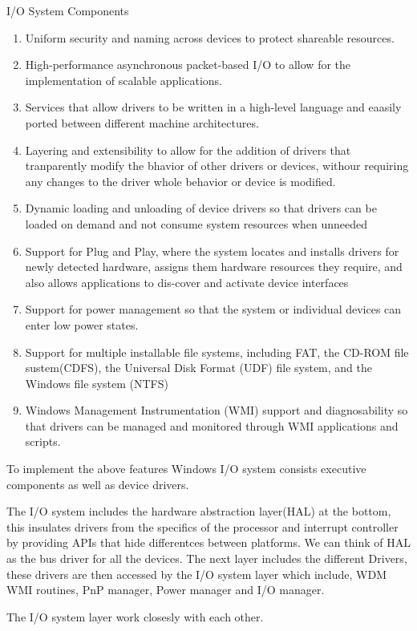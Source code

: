 \documentclass[letterpaper,10pt,draftclsnofoot,onecolumn]{IEEEtran}
\begin{document}
I/O System Components
\begin{enumerate}
\item Uniform security and naming across devices to protect shareable resources.
\item High-performance asynchronous packet-based I/O to allow for the implementation of scalable applications.
\item Services that allow drivers to be written in a high-level language and eaasily ported between different machine architectures.
\item Layering and extensibility to allow for the addition of drivers that tranparently modify the bhavior of other drivers or devices, withour requiring any changes to the driver whole behavior or device is modified.
\item Dynamic loading and unloading of device drivers so that drivers can be loaded on demand and not consume system resources when unneeded
\item Support for Plug and Play, where the system locates and installs drivers for newly detected hardware, assigns them hardware resources they require, and also allows applications to dis-cover and activate device interfaces
\item Support for power management so that the system or individual devices can enter low power states.
\item Support for multiple installable file systems, including FAT, the CD-ROM file sustem(CDFS), the Universal Disk Format (UDF) file system, and the Windows file system (NTFS)
\item Windows Management Instrumentation (WMI) support and diagnosability so that drivers can be managed and monitored through WMI applications and scripts.\cite{[1]}
\end{enumerate}

To implement the above features Windows I/O system consists executive components as well as device drivers.

The I/O system includes the hardware abstraction layer(HAL) at the bottom, this insulates drivers from the specifics of the processor and interrupt controller by providing APIs that hide differentces between platforms. We can think of HAL as the bus driver for all the devices. The next layer includes the different Drivers, these drivers are then accessed by the I/O system layer which include, WDM WMI routines, PnP manager, Power manager and I/O manager.

The I/O system layer work closesly with each other.
\end{document}
